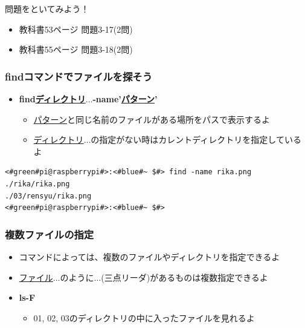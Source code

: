 \documentclass[slide03.tex]{subfiles}
\begin{document}
\begin{frame}
    \begin{exampleblock}{問題をといてみよう！}
        \begin{itemize}
            \item 教科書53ページ 問題3-17(2問)
            \item 教科書55ページ 問題3-18(2問)
        \end{itemize}
    \end{exampleblock}
\end{frame}

\begin{frame}[fragile]
    \frametitle{findコマンドでファイルを探そう}
    \begin{itemize}
        \item {\bf find\textvisiblespace\underline{ディレクトリ}$\ldots$\textvisiblespace -name\textvisiblespace '\underline{パターン}'}
        \begin{itemize}
            \item \underline{パターン}と同じ名前のファイルがある場所をパスで表示するよ
            \item \underline{ディレクトリ}$\ldots$の指定がない時はカレントディレクトリを指定しているよ
        \end{itemize}
    \end{itemize}
    \begin{lstlisting}[title=rika.pngをfindコマンドで探す]
<#green#pi@raspberrypi#>:<#blue#~ $#> find -name rika.png
./rika/rika.png
./03/rensyu/rika.png
<#green#pi@raspberrypi#>:<#blue#~ $#>
    \end{lstlisting}
\end{frame}

\begin{frame}
    \frametitle{複数ファイルの指定}
    \begin{itemize}
        \item コマンドによっては、複数のファイルやディレクトリを指定できるよ
        \item \underline{ファイル}$\ldots$のように$\ldots$(三点リーダ)があるものは複数指定できるよ
        \item {\bf ls\textvisiblespace -F}
        \begin{itemize}
            \item 01, 02, 03のディレクトリの中に入ったファイルを見れるよ
        \end{itemize}
    \end{itemize}
\end{frame}
\end{document}
